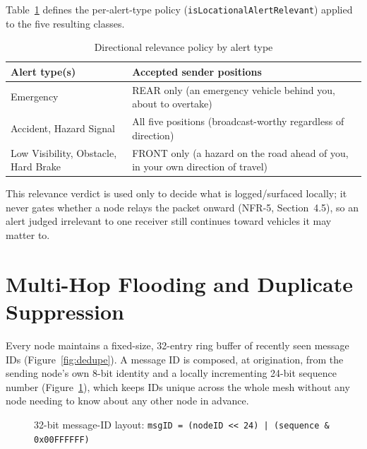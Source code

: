 \documentclass[12pt,a4paper]{report}
\begin{document}
Table~\ref{tab:relevancepolicy} defines the per-alert-type policy (\texttt{isLocationalAlertRelevant}) applied to the five resulting classes.

\begin{table}[H]
\centering
\caption{Directional relevance policy by alert type}
\label{tab:relevancepolicy}
\begin{tabular}{@{}lp{9.6cm}@{}}
\toprule
\textbf{Alert type(s)} & \textbf{Accepted sender positions} \\
\midrule
Emergency & REAR only (an emergency vehicle behind you, about to overtake) \\
Accident, Hazard Signal & All five positions (broadcast-worthy regardless of direction) \\
Low Visibility, Obstacle, Hard Brake & FRONT only (a hazard on the road ahead of you, in your own direction of travel) \\
\bottomrule
\end{tabular}
\end{table}

\noindent This relevance verdict is used only to decide what is logged/surfaced locally; it never gates whether a node relays the packet onward (NFR-5, Section~4.5), so an alert judged irrelevant to one receiver still continues toward vehicles it may matter to.

\section{Multi-Hop Flooding and Duplicate Suppression}
Every node maintains a fixed-size, 32-entry ring buffer of recently seen message IDs (Figure~\ref{fig:dedupe}). A message ID is composed, at origination, from the sending node's own 8-bit identity and a locally incrementing 24-bit sequence number (Figure~\ref{fig:msgid}), which keeps IDs unique across the whole mesh without any node needing to know about any other node in advance.

\begin{figure}[H]
\centering
{}
\caption{32-bit message-ID layout: \texttt{msgID = (nodeID << 24) | (sequence \& 0x00FFFFFF)}}
\label{fig:msgid}
\end{figure}
\end{document}
